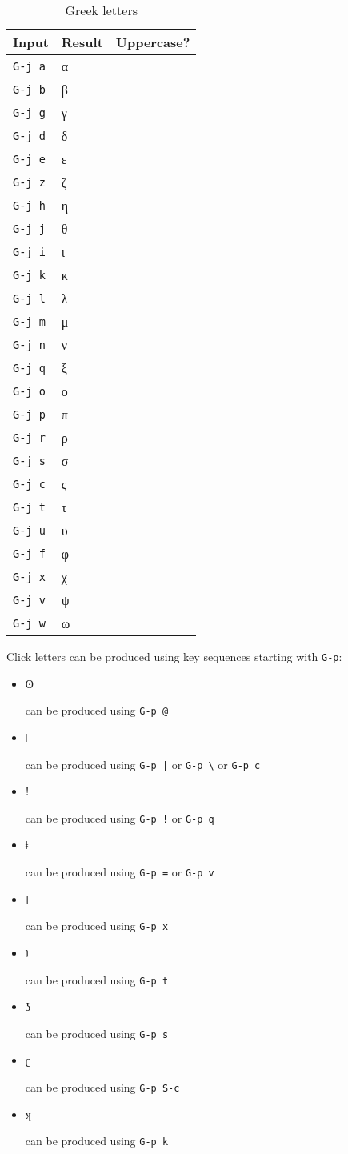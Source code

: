 \documentclass[oneside]{memoir}
\newcommand{\cmark}{\ding{51}}
\newcommand{\xmark}{\ding{55}}
\newcommand{\key}{\verb}
\newcommand{\outsp}[1]{\colorbox{gray!20}{\strut{}#1}}
\begin{document}
{{{\begin{wraptable}[22]{r}{5cm}
\centering
\caption{Greek letters}
\label{tab:greek_letters}
\begin{tabular}{lll}
\toprule
Input & Result & Uppercase? \\
\midrule
\key|G-j a| & α & \cmark \\
\key|G-j b| & β & \cmark \\
\key|G-j g| & γ & \cmark \\
\key|G-j d| & δ & \cmark \\
\key|G-j e| & ε & \cmark \\
\key|G-j z| & ζ & \cmark \\
\key|G-j h| & η & \cmark \\
\key|G-j j| & θ & \cmark \\
\key|G-j i| & ι & \cmark \\
\key|G-j k| & κ & \cmark \\
\key|G-j l| & λ & \cmark \\
\key|G-j m| & μ & \cmark \\
\key|G-j n| & ν & \cmark \\
\key|G-j q| & ξ & \cmark \\
\key|G-j o| & ο & \cmark \\
\key|G-j p| & π & \cmark \\
\key|G-j r| & ρ & \cmark \\
\key|G-j s| & σ & \cmark \\
\key|G-j c| & ς & \xmark \\
\key|G-j t| & τ & \cmark \\
\key|G-j u| & υ & \cmark \\
\key|G-j f| & φ & \cmark \\
\key|G-j x| & χ & \cmark \\
\key|G-j v| & ψ & \cmark \\
\key|G-j w| & ω & \cmark \\
\bottomrule
\end{tabular}
\end{wraptable}

Click letters can be produced using key sequences starting with \key|G-p|:

\begin{itemize}[noitemsep]
\item \outsp{ʘ} can be produced using \key|G-p @|
\item \outsp{ǀ} can be produced using \key!G-p |! or \key|G-p \| or \key|G-p c|
\item \outsp{ǃ} can be produced using \key|G-p !| or \key|G-p q|
\item \outsp{ǂ} can be produced using \key|G-p =| or \key|G-p v|
\item \outsp{ǁ} can be produced using \key|G-p x|
\item \outsp{ʇ} can be produced using \key|G-p t|
\item \outsp{ʖ} can be produced using \key|G-p s|
\item \outsp{ʗ} can be produced using \key|G-p S-c|
\item \outsp{ʞ} can be produced using \key|G-p k|
\end{itemize}

}}}
\end{document}

